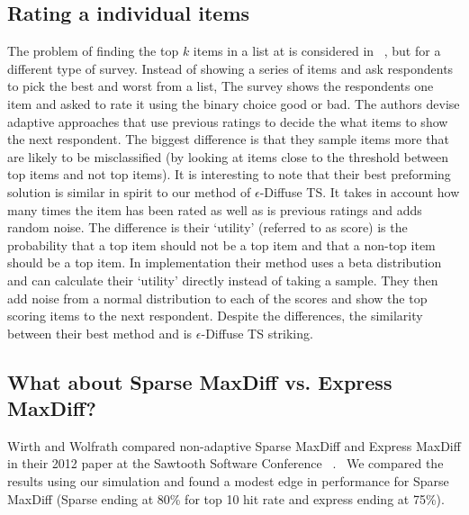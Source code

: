 \documentclass[nonblindrev]{informs3}
\begin{document}
\subsection{Rating a individual items}
The problem of finding the top $k$ items in a list at is considered in ~\cite{toubia2007adaptive}, but for a different type of survey. Instead of showing a series of items and ask respondents to pick the best and worst from a list, The survey shows the respondents one item and asked to rate it using the binary choice good or bad. The authors devise adaptive approaches that use previous ratings to decide the what items to show the next respondent. The biggest difference is that they sample items more that are likely to be misclassified (by looking at items close to the threshold between top items and not top items).  It is interesting to note that their best preforming solution is similar in spirit to our method of $\epsilon$-Diffuse TS. It takes in account how many times the item has been rated as well as is previous ratings and adds random noise. The difference is their `utility' (referred to as score) is the probability that a top item should not be a top item and that a non-top item should be a top item. In implementation their method uses a beta distribution and can calculate their `utility' directly instead of taking a sample. They then add noise from a normal distribution to each of the scores and show the top scoring items to the next respondent. Despite the differences, the similarity between their best method and is $\epsilon$-Diffuse TS striking.

\subsection{What about Sparse MaxDiff vs. Express MaxDiff?}
Wirth and Wolfrath compared non-adaptive Sparse MaxDiff and Express MaxDiff in their 2012 paper at the Sawtooth Software Conference ~\cite{wirth2012largeset}.  We compared the results using our simulation and found a modest edge in performance for Sparse MaxDiff (Sparse ending at 80\% for top 10 hit rate and express ending at 75\%).
\end{document}
